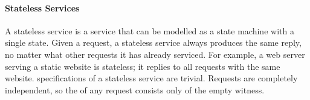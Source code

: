 \paragraph{Stateless Services}
A stateless service is a service that can be modelled as a state machine with a
single state. Given a request, a stateless service always produces the same
reply, no matter what other requests it has already serviced.  For example, a
web server serving a static website is stateless; it replies to all requests
with the same website. \Watprovenance{} specifications of a stateless service
are trivial. Requests are completely independent, so the \watprovenance{} of
any request consists only of the empty witness.

%
%
